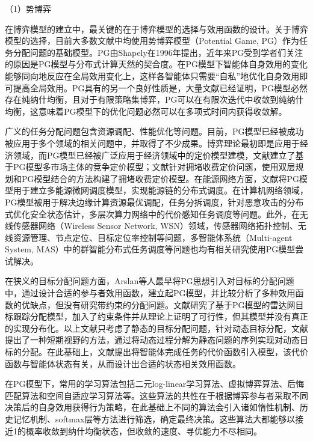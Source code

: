 （1）势博弈

	在博弈模型的建立中，最关键的在于博弈模型的选择与效用函数的设计。关于博弈模型的选择，目前大多数文献中均使用势博弈模型（Potential Game, PG）作为任务分配问题的基础模型。PG由Shapely在1996年提出\cite{monderer_potential_1996}，近年来PG受到学者们关注的原因是PG模型与分布式计算天然的契合度。在PG模型下智能体自身效用的变化能够同向地反应在全局效用变化上，这样各智能体只需要“自私”地优化自身效用即可提高全局效用。PG具有的另一个良好性质是，大量文献已经证明，PG模型必然存在纯纳什均衡，且对于有限策略集博弈，PG可以在有限次迭代中收敛到纯纳什均衡，这意味着PG模型下的优化问题必然可以在多项式时间内获得收敛解。

广义的任务分配问题包含资源调配、性能优化等问题。目前，PG模型已经被成功被应用于多个领域的相关问题中，并取得了不少成果。博弈理论最初即是应用于经济领域，而PG模型已经被广泛应用于经济领域中的定价模型建模，文献\parencite{liuhongguo_2020}建立了基于PG模型多市场主体的竞争定价模型；文献\parencite{liupenghuang_2020}针对拥堵收费定价问题，使用双层规划和PG模型结合的方法构建了拥堵收费定价模型。在能源网络方面，文献\parencite{shaochong_2020}将PG模型用于建立多能源微网调度模型，实现能源链的分布式调度。在计算机网络领域，PG模型被用于解决边缘计算资源最优调配\cite{Mahn_game_2020}，任务分拆调度\cite{liujijun_2020,zhanggenshan_2019}，针对恶意攻击的分布式优化安全状态估计\cite{gongjunhui_2020}，多层次算力网络中的代价感知任务调度\cite{liuzening_2020}等问题。此外，在无线传感器网络（Wireless Sensor Network, WSN）领域，传感器网络拓扑控制\cite{heqiuge_2017,heyaguang_2019}、无线资源管理\cite{chen_2015,haoxiaochen_2015}、节点定位\cite{jiajie_2014}、目标定位率控制\cite{moragrega_2015}等问题，多智能体系统（Multi-agent System, MAS）中的群智能分布式任务调度\cite{caoxin_2020}等问题也均有相关研究使用PG模型尝试解决。

在狭义的目标分配问题方面，Arslan等人\cite{arslan_autonomous_2007}最早将PG思想引入对目标的分配问题中，通过设计合适的参与者效用函数，建立起PG模型，并比较分析了多种效用函数的优缺点，但没有研究带约束的分配问题。文献\parencite{hanpeng_2020}研究了基于PG模型的雷达网目标跟踪分配模型，加入了约束条件并从理论上证明了可行性，但其模型并没有真正的实现分布化。以上文献只考虑了静态的目标分配问题，针对动态目标分配，文献\parencite{chapman_2010}提出了一种短期视野的方法，通过将动态过程分解为静态问题的序列实现对动态目标的分配。在此基础上，文献\parencite{bakolas_decentralized_2020}提出将智能体完成任务的代价函数引入模型，该代价函数与智能体状态有关，从而设计出合适的状态相关效用函数。

在PG模型下，常用的学习算法包括二元log-linear学习算法\cite{marden_revisiting_2010}、虚拟博弈算法\cite{marden_joint_2009}、后悔匹配算法\cite{Lhazmir_2018}和空间自适应学习算法\cite{deng_2019}等。这些算法的共性在于根据博弈参与者采取不同决策后的自身效用获得行为策略，在此基础上不同的算法会引入诸如惰性机制、历史记忆机制、softmax层等方法进行筛选，确定最终决策。这些算法大都能够以接近1的概率收敛到纳什均衡状态，但收敛的速度、寻优能力不尽相同。


